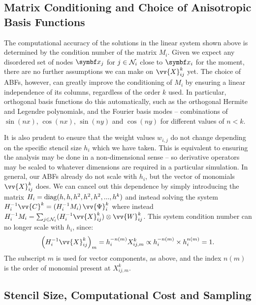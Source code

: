 \subsection{Matrix Conditioning and Choice of Anisotropic Basis Functions}

The computational accuracy of the solutions in the linear system shown above is determined by the condition number of the matrix $M_i$. Given we expect any disordered set of nodes $\vb{x}_j$ for $j \in \cl{N}_i$ close to $\vb{x}_i$ for the moment, there are no further assumptions we can make on $\vv{X}^k_{ij}$ yet. The choice of ABFs, however, can greatly improve the conditioning of $M_i$ by ensuring a linear independence of its columns, regardless of the order $k$ used. In particular, orthogonal basis functions do this automatically, such as the orthogonal Hermite and Legendre polynomials, and the Fourier basis modes -- combinations of $\sin(nx)$, $\cos(nx)$, $\sin(ny)$ and $\cos(ny)$ for different values of $n < k$.

It is also prudent to ensure that the weight values $w_{i ,j}$ do not change depending on the specific stencil size $h_i$ which we have taken. This is equivalent to ensuring the analysis may be done in a non-dimensional sense -- so derivative operators may be scaled to whatever dimensions are required in a particular simulation. In general, our ABFs already do not scale with $h_i$, but the vector of monomials $\vv{X}^k_{ij}$ does. We can cancel out this dependence by simply introducing the matrix $H_i = \rm{diag}(h, h, h^2, h^2, h^2, ..., h^k)$ and instead solving the system $H_i^{-1} \vv{C}^k = (H_i^{-1} M_i) \, \vv{\Psi}^k_i$ where instead $H_i^{-1} M_i = \sum_{j \in \cl{N}_i} (H_i^{-1} \vv{X}^k_{ij}) \otimes \vv{W}^k_{ij}$. This system condition number can no longer scale with $h_i$, since:
\begin{equation}
\left( H_i^{-1} \vv{X}^k_{ij} \right)_m
= h_i^{-n(m)} X^k_{ij, m}
\propto h_i^{-n(m)} \times h_i^{n(m)} = 1.
\end{equation}
The subscript $m$ is used for vector components, as above, and the index $n(m)$ is the order of monomial present at $X^k_{ij, m}$.



\subsection{Stencil Size, Computational Cost and Sampling}

